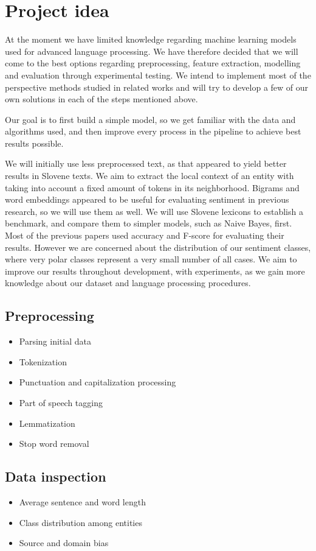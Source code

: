 \documentclass[11pt,a4paper]{article}
\begin{document}
\section{Project idea}
At the moment we have limited knowledge regarding machine learning models used for advanced language processing. We have therefore decided that we will come to the best options regarding preprocessing, feature extraction, modelling and evaluation through experimental testing. We intend to implement most of the perspective methods studied in related works and will try to develop a few of our own solutions in each of the steps mentioned above.

Our goal is to first build a simple model, so we get familiar with the data and algorithms used, and then improve every process in the pipeline to achieve best results possible.

We will initially use less preprocessed text, as that appeared to yield better results in Slovene texts. We aim to extract the local context of an entity with taking into account a fixed amount of tokens in its neighborhood. Bigrams and word embeddings appeared to be useful for evaluating sentiment in previous research, so we will use them as well. We will use Slovene lexicons to establish a benchmark, and compare them to simpler models, such as Naive Bayes, first. Most of the previous papers used accuracy and F-score for evaluating their results. However we are concerned about the distribution of our sentiment classes, where very polar classes represent a very small number of all cases. We aim to improve our results throughout development, with experiments, as we gain more knowledge about our dataset and language processing procedures.

\subsection{Preprocessing}
\begin{itemize}
  \item Parsing initial data
  \item Tokenization
  \item Punctuation and capitalization processing
  \item Part of speech tagging
  \item Lemmatization
  \item Stop word removal
\end{itemize}

\subsection{Data inspection}
\begin{itemize}
  \item Average sentence and word length
  \item Class distribution among entities
  \item Source and domain bias
\end{itemize}
\end{document}
